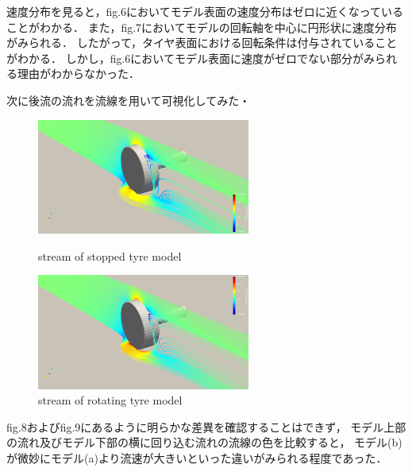 \documentclass[twocolumn,a4j]{jsarticle}
\begin{document}
\newpage
速度分布を見ると，fig.6においてモデル表面の速度分布はゼロに近くなっていることがわかる．
また，fig.7においてモデルの回転軸を中心に円形状に速度分布がみられる．
したがって，タイヤ表面における回転条件は付与されていることがわかる．
しかし，fig.6においてモデル表面に速度がゼロでない部分がみられる理由がわからなかった．
\par
次に後流の流れを流線を用いて可視化してみた・
\begin{figure}[htbp]
    \begin{center}
        \includegraphics[width=70mm]{screenshots/tyremodel_stream2.png}
        \caption{stream of stopped tyre model}
        \includegraphics[width=70mm]{screenshots/tyremodel_stream2_r.png}
        \caption{stream of rotating tyre model}
    \end{center}
\end{figure}

\newpage
fig.8およびfig.9にあるように明らかな差異を確認することはできず，
モデル上部の流れ及びモデル下部の横に回り込む流れの流線の色を比較すると，
モデル(b)が微妙にモデル(a)より流速が大きいといった違いがみられる程度であった．\\
\end{document}
